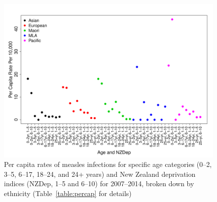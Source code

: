 \documentclass{article}
\begin{document}
\begin{figure}
\begin{center}
\includegraphics{draftfinalreport-010}
\end{center}
\caption{Per capita rates of measles infections for specific age categories (0--2, 3--5, 6--17, 18--24, and 24+ years) and New Zealand deprivation indices (NZDep, 1--5 and 6--10) for 2007--2014, broken down by ethnicity (Table~\autoref{table:percap} for details)}
\label{fig:percap}
\end{figure}
\end{document}
